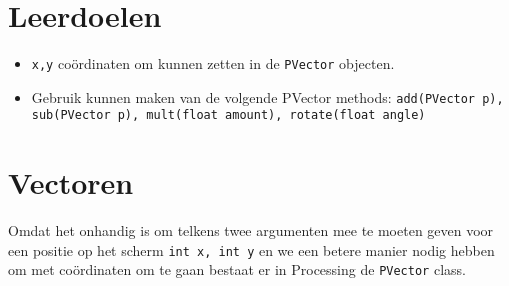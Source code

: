 \newcommand{\tttt}{Vectoren}
\newcommand{\dddd}{Datum 1}



\section{Leerdoelen}
\begin{itemize}
	\item \texttt{x,y} co\"ordinaten om kunnen zetten in de \texttt{PVector} objecten.
	\item Gebruik kunnen maken van de volgende PVector methods: \texttt{add(PVector p), sub(PVector p), mult(float amount), rotate(float angle)}
\end{itemize}

\section{Vectoren}
Omdat het onhandig is om telkens twee argumenten mee te moeten geven voor een positie op het scherm \texttt{int x, int y} en we een betere manier nodig hebben om met co\"ordinaten om te gaan bestaat er in Processing de \texttt{PVector} class.

